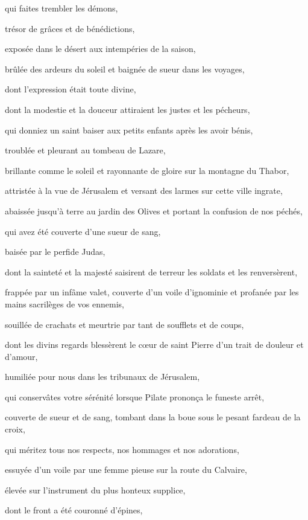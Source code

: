 \documentclass{bibliotheca-missel}
\begin{document}
\begin{litanie}
\item qui faites trembler les démons,
\item trésor de grâces et de bénédictions,
\item exposée dans le désert aux intempéries de la saison,
\item brûlée des ardeurs du soleil et baignée de sueur dans les voyages,
\item dont l’expression était toute divine,
\item dont la modestie et la douceur attiraient les justes et les pécheurs,
\item qui donniez un saint baiser aux petits enfants après les avoir bénis,
\item troublée et pleurant au tombeau de Lazare,
\item brillante comme le soleil et rayonnante de gloire sur la montagne du Thabor,
\item attristée à la vue de Jérusalem et versant des larmes sur cette ville ingrate,
\item abaissée jusqu’à terre au jardin des Olives et portant la confusion de nos péchés,
\item qui avez été couverte d’une sueur de sang,
\item baisée par le perfide Judas,
\item dont la sainteté et la majesté saisirent de terreur les soldats et les renversèrent,
\item frappée par un infâme valet, couverte d’un voile d’ignominie et profanée par les mains sacrilèges de vos ennemis,
\item souillée de crachats et meurtrie par tant de soufflets et de coups,
\item dont les divins regards blessèrent le cœur de saint Pierre d’un trait de douleur et d’amour,
\item humiliée pour nous dans les tribunaux de Jérusalem,
\item qui conservâtes votre sérénité lorsque Pilate prononça le funeste arrêt,
\item couverte de sueur et de sang, tombant dans la boue sous le pesant fardeau de la croix,
\item qui méritez tous nos respects, nos hommages et nos adorations,
\item essuyée d’un voile par une femme pieuse sur la route du Calvaire,
\item élevée sur l’instrument du plus honteux supplice,
\item dont le front a été couronné d’épines,

\end{litanie}
\end{document}
